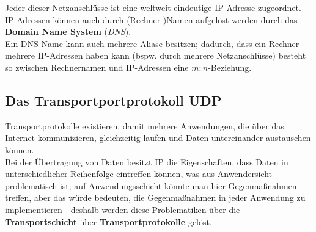 \noindent
Jeder dieser Netzanschlüsse ist eine weltweit eindeutige IP-Adresse zugeordnet.\\

\noindent
IP-Adressen können auch durch (Rechner-)Namen aufgelöst werden durch das \textbf{Domain Name System} (\textit{DNS}).\\

\noindent
Ein DNS-Name kann auch mehrere Aliase besitzen; dadurch, dass ein Rechner mehrere IP-Adressen haben kann (bspw. durch mehrere Netzanschlüsse) besteht so zwischen Rechnernamen und IP-Adressen eine $m:n$-Beziehung.


\subsection{Das Transportportprotokoll UDP}

Transportprotokolle existieren, damit mehrere Anwendungen, die über das Internet kommunizieren, gleichzeitig laufen und Daten untereinander austauschen können.\\

\noindent
Bei der Übertragung von Daten besitzt IP die Eigenschaften, dass Daten in unterschiedlicher Reihenfolge eintreffen können, was aus Anwendersicht problematisch ist; auf Anwendungsschicht könnte man hier Gegenmaßnahmen treffen, aber das würde bedeuten, die Gegenmaßnahmen in jeder Anwendung zu implementieren - deshalb werden diese Problematiken über die \textbf{Transportschicht} über \textbf{Transportprotokolle} gelöst.









